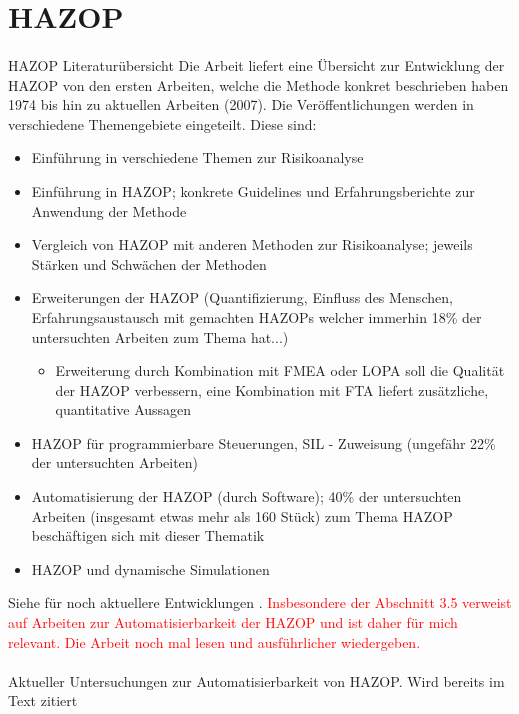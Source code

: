 \section{HAZOP}
\paragraph*{\cite{Dunjo_2010}} HAZOP Literatur\"ubersicht \hfill \newline
Die Arbeit liefert eine \"Ubersicht zur Entwicklung der HAZOP von den ersten Arbeiten, welche die Methode konkret beschrieben haben %
1974 bis hin zu aktuellen Arbeiten (2007). Die Ver\"offentlichungen werden in verschiedene Themengebiete eingeteilt. Diese sind: \begin{itemize}
\item Einf\"uhrung in verschiedene Themen zur Risikoanalyse
\item Einf\"uhrung in HAZOP; konkrete Guidelines und Erfahrungsberichte zur Anwendung der Methode
\item Vergleich von HAZOP mit anderen Methoden zur Risikoanalyse; jeweils St\"arken und Schw\"achen der Methoden
\item Erweiterungen der HAZOP (Quantifizierung, Einfluss des Menschen, Erfahrungsaustausch mit gemachten HAZOPs welcher immerhin 18\% der untersuchten Arbeiten zum Thema hat...)
  \begin{itemize}
  \item Erweiterung durch Kombination mit FMEA oder LOPA soll die Qualit\"at der HAZOP verbessern, eine Kombination mit FTA liefert zus\"atzliche, quantitative Aussagen
  \end{itemize}
\item HAZOP f\"ur programmierbare Steuerungen, SIL - Zuweisung (ungef\"ahr 22\% der untersuchten Arbeiten)
\item Automatisierung der HAZOP (durch Software); 40\% der untersuchten Arbeiten (insgesamt etwas mehr als 160 St\"uck) zum Thema HAZOP besch\"aftigen sich mit dieser Thematik
\item HAZOP und dynamische Simulationen
\end{itemize}
Siehe f\"ur noch aktuellere Entwicklungen \cite{Pasman_2016}.
\textcolor{red}{Insbesondere der Abschnitt 3.5 verweist auf Arbeiten zur Automatisierbarkeit der HAZOP und ist daher f\"ur mich relevant.}
\textcolor{red}{Die Arbeit noch mal lesen und ausf\"uhrlicher wiedergeben.}

\paragraph*{\cite{Pasman_2016}} Aktueller Untersuchungen zur Automatisierbarkeit von HAZOP. Wird bereits im Text zitiert

